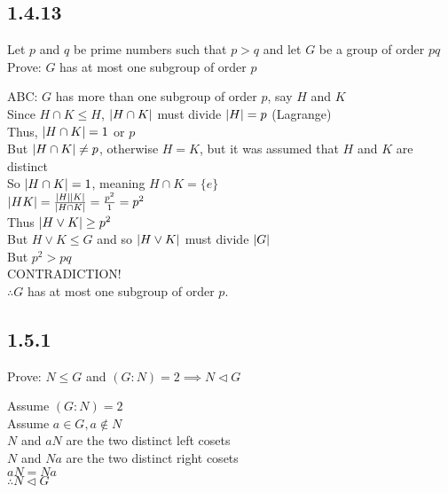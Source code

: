 \documentclass[letterpaper,12pt,fleqn]{article}
\newcommand{\n}{\mathrel{\triangleleft}}
\begin{document}
\subsection*{1.4.13}

Let $p$ and $q$ be prime numbers such that $p>q$ and let $G$ be a group of
order $pq$ \\
Prove: $G$ has at most one subgroup of order $p$

ABC: $G$ has more than one subgroup of order $p$, say $H$ and $K$ \\
Since $H\cap K\le H$, $\lvert H\cap K\rvert$ must divide $\lvert H\rvert=p$ (Lagrange) \\
Thus, $\lvert H\cap K\rvert=1$ or $p$ \\
But $\lvert H\cap K\rvert\ne p$, otherwise $H=K$, but it was assumed that $H$ and $K$
are distinct \\
So $\lvert H\cap K\rvert=1$, meaning $H\cap K=\{e\}$ \\
$\lvert HK\rvert=\frac{\lvert H\rvert\lvert K\rvert}{\lvert H\cap K\rvert}=\frac{p^2}{1}=p^2$ \\
Thus $\lvert H\vee K\rvert\ge p^2$ \\
But $H\vee K\le G$ and so $\lvert H\vee K\rvert$ must divide $\lvert G\rvert$ \\
But $p^2>pq$ \\
CONTRADICTION! \\
$\therefore G$ has at most one subgroup of order $p$.

\subsection*{1.5.1}

Prove: $N\le G$ and $(G:N)=2\implies N\n G$

\begin{minipage}{3.5in}
  Assume $(G:N)=2$ \\
  Assume $a\in G,a\notin N$ \\
  $N$ and $aN$ are the two distinct left cosets \\
  $N$ and $Na$ are the two distinct right cosets \\
  $aN=Na$ \\
  $\therefore N\n G$
\end{minipage}
\begin{minipage}{3in}
\end{minipage}
\end{document}
